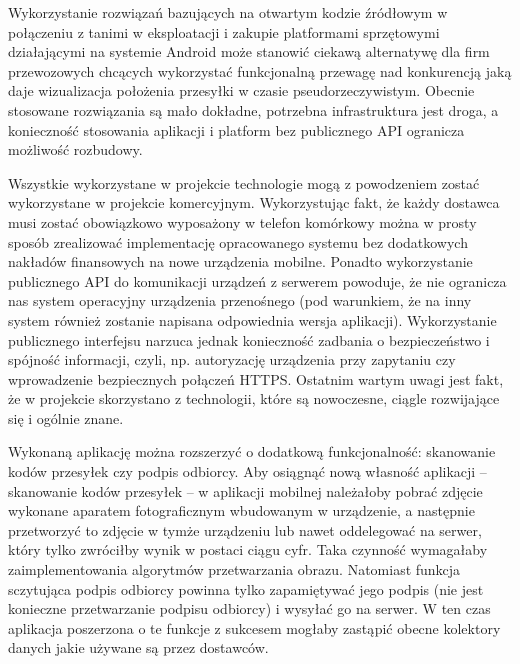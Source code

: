 \documentclass[eng,printmode,oneside]{mgr}
\begin{document}
Wykorzystanie rozwiązań bazujących na otwartym kodzie źródłowym w połączeniu 
z tanimi w eksploatacji i zakupie platformami sprzętowymi działającymi na systemie 
Android może stanowić ciekawą alternatywę dla firm przewozowych chcących wykorzystać 
funkcjonalną przewagę nad konkurencją jaką daje wizualizacja położenia przesyłki 
w czasie pseudorzeczywistym. Obecnie stosowane rozwiązania są mało dokładne, 
potrzebna infrastruktura jest droga, a konieczność stosowania aplikacji i 
platform bez publicznego API ogranicza możliwość rozbudowy.

Wszystkie wykorzystane w projekcie technologie mogą z powodzeniem zostać
wykorzystane w projekcie komercyjnym. Wykorzystując fakt, że każdy dostawca musi
zostać obowiązkowo wyposażony w telefon komórkowy można w prosty sposób
zrealizować implementację opracowanego systemu bez dodatkowych nakładów
finansowych na nowe urządzenia mobilne. Ponadto wykorzystanie publicznego API do
komunikacji urządzeń z serwerem powoduje, że nie ogranicza nas system operacyjny
urządzenia przenośnego (pod warunkiem, że na inny system również zostanie
napisana odpowiednia wersja aplikacji). Wykorzystanie publicznego interfejsu
narzuca jednak konieczność zadbania o bezpieczeństwo i spójność informacji,
czyli, np. autoryzację urządzenia przy zapytaniu czy wprowadzenie bezpiecznych połączeń HTTPS.
Ostatnim wartym uwagi jest fakt, że w projekcie skorzystano z technologii, które
są nowoczesne, ciągle rozwijające się i ogólnie znane.

Wykonaną aplikację można rozszerzyć o dodatkową funkcjonalność: skanowanie
kodów przesyłek czy podpis odbiorcy. Aby osiągnąć nową własność aplikacji --
skanowanie kodów przesyłek -- w aplikacji mobilnej należałoby pobrać zdjęcie
wykonane aparatem fotograficznym wbudowanym w urządzenie, a następnie
przetworzyć to zdjęcie w tymże urządzeniu lub nawet oddelegować na serwer, który
tylko zwróciłby wynik w postaci ciągu cyfr. Taka czynność wymagałaby
zaimplementowania algorytmów przetwarzania obrazu. Natomiast funkcja sczytująca
podpis odbiorcy powinna tylko zapamiętywać jego podpis (nie jest konieczne
przetwarzanie podpisu odbiorcy) i wysyłać go na serwer. W ten czas aplikacja
poszerzona o te funkcje z sukcesem mogłaby zastąpić obecne kolektory danych
jakie używane są przez dostawców.



\listoffigures
\lstlistoflistings
\end{document}
